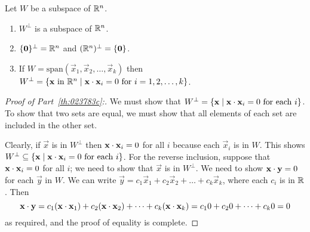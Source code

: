 \documentclass{ximera}
\begin{document}
\begin{theorem}\label{th:023783}
Let $W$ be a subspace of $\mathbb{R}^n$.
\begin{enumerate}
\item\label{th:023783a} $W^\perp$ is a subspace of $\mathbb{R}^n$.

\item\label{th:023783b} $\{\mathbf{0}\}^\perp = \mathbb{R}^n$ and $(\mathbb{R}^n)^\perp = \{\mathbf{0}\}$.

\item\label{th:023783c} If $W = \mbox{span}\left(\vec{x}_{1}, \vec{x}_{2}, \dots, \vec{x}_{k}\right)$ then $W^\perp = \{\mathbf{x} \mbox{ in } \mathbb{R}^n \mid \mathbf{x} \cdot \mathbf{x}_{i} = 0 \mbox{ for } i = 1, 2, \dots, k\}$.

\end{enumerate}
\end{theorem}

\begin{proof}[Proof of Part~\ref{th:023783c}:]
We must show that $W^\perp = \{\mathbf{x} \mid \mathbf{x} \cdot \mathbf{x}_{i} = 0 \mbox{ for each } i\}$.  To show that two sets are equal, we must show that all elements of each set are included in the other set.

Clearly, if $\vec{x}$ is in $W^\perp$ then $\mathbf{x} \cdot \mathbf{x}_{i} = 0$ for all $i$ because each $\vec{x}_{i}$ is in $W$. This shows $W^\perp \subseteq \{\mathbf{x} \mid \mathbf{x} \cdot \mathbf{x}_{i} = 0 \mbox{ for each } i\}$. For the reverse inclusion, suppose that $\mathbf{x} \cdot \mathbf{x}_{i} = 0$ for all $i$; we need to show that $\vec{x}$ is in $W^\perp$.  We need to show $\mathbf{x} \cdot \mathbf{y} = 0$ for each $\vec{y}$ in $W$. We can write $\vec{y} = c_{1}\vec{x}_{1} + c_{2}\vec{x}_{2} + \dots  + c_{k}\vec{x}_{k}$, where each $c_{i}$ is in $\mathbb{R}$. Then
\begin{equation*}
\mathbf{x} \cdot \mathbf{y} = c_{1}(\mathbf{x} \cdot \mathbf{x}_{1}) + c_{2}(\mathbf{x} \cdot \mathbf{x}_{2})+ \dots +c_{k}(\mathbf{x} \cdot \mathbf{x}_{k}) = c_{1}0 + c_{2}0 + \dots + c_{k}0 = 0
\end{equation*}
 as required, and the proof of equality is complete.

\end{proof}
\end{document}
